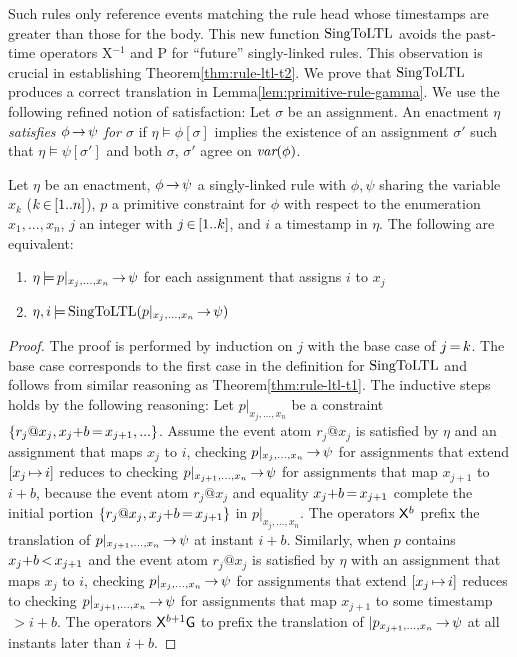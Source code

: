 Such rules only reference events matching the rule head
whose timestamps are greater than those for the body.
This new function $\text{SingToLTL}$
avoids the past-time operators {\sf X}$^{-1}$ and {\sf P}
for ``future'' singly-linked rules.
This observation is crucial
in establishing Theorem\:\ref{thm:rule-ltl-t2}.
We prove that $\text{SingToLTL}$ produces a correct translation
in Lemma\:\ref{lem:primitive-rule-gamma}.
We use the following refined notion of satisfaction:
Let $\sigma$ be an assignment.
An enactment $\eta$
{\em satisfies $\phi \,{\rightarrow}\, \psi$ for $\sigma$}
if $\eta\models\phi[\sigma]$ implies
the existence of an assignment $\sigma'$
such that $\eta\models\psi[\sigma']$ and
both $\sigma$, $\sigma'$ agree on $\textit{var}(\phi)$.

\begin{lemma}\label{lem:primitive-rule-gamma}
  Let $\eta$ be an enactment,
  $\phi\,{\rightarrow}\,\psi$ a singly-linked rule 
  with $\phi,\psi$ sharing the variable $x_k$ ($k\,{\in}\,[1..n]$),
  $p$ a primitive constraint for $\phi$
  with respect to the enumeration $x_1,...,x_n$,
  $j$ an integer with $j\,{\in}\,[1..k]$,
  and $i$ a timestamp in $\eta$.
  The following are equivalent:
  
  \begin{enumerate}
  \item
    $\eta\,{\models}\, p|_{x_j,...,x_n}\,{\rightarrow}\,\psi$
    for each assignment that assigns $i$ to $x_j$
  \item
    $\eta,i \,{\models}\,
    \text{SingToLTL}(p|_{x_j,...,x_n}\,{\rightarrow}\,\psi)$
  \end{enumerate}
\end{lemma} 

\begin{proof}
The proof is performed by induction on $j$ with the base case of $j\,{=}\,k$.
The base case corresponds to
the first case in the definition for $\text{SingToLTL}$
and follows from similar reasoning as Theorem\:\ref{thm:rule-ltl-t1}.
The inductive steps
holds by the following reasoning:
Let $p|_{x_j,...,x_n}$ be
a constraint $\{r_j@x_j,x_j{+}b\,{=}\,x_{j+1},...\}$.
Assume the event atom $r_j@x_j$ is satisfied by $\eta$ and
an assignment that maps $x_j$ to $i$,
checking $p|_{x_j,...,x_n}\,{\rightarrow}\, \psi$
for assignments that extend $[x_j\,{\mapsto}\, i]$
reduces to checking
$p|_{x_{j+1},...,x_n}\,{\rightarrow}\, \psi$
for assignments that map $x_{j+1}$ to $i{+}b$,
because the event atom $r_j@x_j$ and equality $x_j{+}b\,{=}\,x_{j+1}$
complete the initial portion
$\{r_j@x_j,x_j{+}b\,{=}\,x_{j+1}\}$ in $p|_{x_j,...,x_n}$.
The operators ${\sf X}^b$
prefix the translation of
$p|_{x_{j+1},...,x_n}\,{\rightarrow}\, \psi$ at instant $i{+}b$.
Similarly,
when $p$ contains $x_j{+}b\,{<}\,x_{j+1}$
and
the event atom $r_j@x_j$ is satisfied by $\eta$
with an assignment that maps $x_j$ to $i$,
checking $p|_{x_j,...,x_n}\,{\rightarrow}\, \psi$
for assignments that extend $[x_j\,{\mapsto}\, i]$
reduces to checking 
$p|_{x_{j+1},...,x_n}\,{\rightarrow}\, \psi$
for assignments that map $x_{j+1}$ to
some timestamp$\,{>}i{+}b$.
The operators ${\sf X}^{b{+}1}{\sf G}$
to prefix the translation of
$|p_{x_{j+1},...,x_n}\,{\rightarrow}\, \psi$ 
at all instants later than $i{+}b$.
\end{proof}

